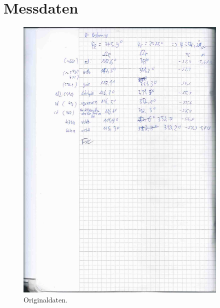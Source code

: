 \section{Messdaten}
% 
% 
%

\begin{figure}[H]
  \centering
  \includegraphics[page=1, height=14cm]{messdaten/original.pdf}
  \caption{Originaldaten.}
  \label{fig:original1}
\end{figure}
